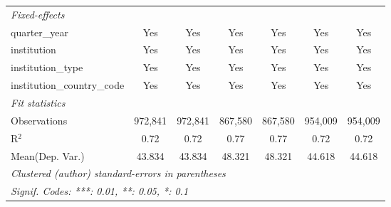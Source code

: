 \begin{tabular}{lcccccc}
   \midrule
   \emph{Fixed-effects}\\
   quarter\_year                      & Yes     & Yes      & Yes        & Yes      & Yes     & Yes\\  
   institution                        & Yes     & Yes      & Yes        & Yes      & Yes     & Yes\\  
   institution\_type                  & Yes     & Yes      & Yes        & Yes      & Yes     & Yes\\  
   institution\_country\_code         & Yes     & Yes      & Yes        & Yes      & Yes     & Yes\\  
   \midrule
   \emph{Fit statistics}\\
   Observations                       & 972,841 & 972,841  & 867,580    & 867,580  & 954,009 & 954,009\\  
   R$^2$                              & 0.72    & 0.72     & 0.77       & 0.77     & 0.72    & 0.72\\  
Mean(Dep. Var.) & 43.834 & 43.834 & 48.321 & 48.321 & 44.618 & 44.618 \\
   \midrule \midrule
   \multicolumn{7}{l}{\emph{Clustered (author) standard-errors in parentheses}}\\
   \multicolumn{7}{l}{\emph{Signif. Codes: ***: 0.01, **: 0.05, *: 0.1}}\\
\end{tabular}
\par\endgroup
